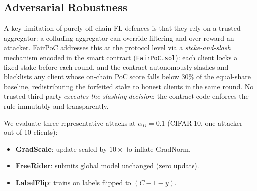 \documentclass[conference]{IEEEtran}
\theoremstyle{remark}
\begin{document}
\subsection{Adversarial Robustness}
\label{subsec:adversarial}

A key limitation of purely off-chain FL defences is that they rely on
a trusted aggregator: a colluding aggregator can override filtering and
over-reward an attacker. FairPoC addresses this at the protocol level
via a \emph{stake-and-slash} mechanism encoded in the smart contract
(\texttt{FairPoC.sol}): each client locks a fixed stake before each
round, and the contract autonomously slashes and blacklists any client
whose on-chain PoC score falls below $30\%$ of the equal-share
baseline, redistributing the forfeited stake to honest clients in the
same round. No trusted third party \emph{executes the slashing decision}: the
contract code enforces the rule immutably and transparently.

We evaluate three representative attacks at $\alpha_D = 0.1$
(CIFAR-10, one attacker out of 10 clients):
\begin{itemize}
  \item \textbf{GradScale}: update scaled by $10\times$ to inflate GradNorm.
  \item \textbf{FreeRider}: submits global model unchanged (zero update).
  \item \textbf{LabelFlip}: trains on labels flipped to $(C{-}1{-}y)$.
\end{itemize}
\end{document}
